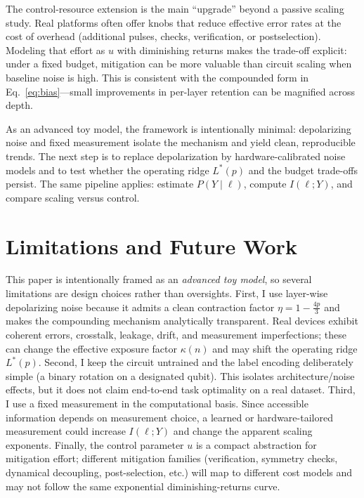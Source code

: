 \documentclass[]{ieeeaccess}
\newcommand{\MI}{I(\ell;Y)}
\begin{document}
The control-resource extension is the main ``upgrade'' beyond a passive scaling study. Real platforms often offer knobs that reduce effective error rates at the cost of overhead (additional pulses, checks, verification, or postselection). Modeling that effort as $u$ with diminishing returns makes the trade-off explicit: under a fixed budget, mitigation can be more valuable than circuit scaling when baseline noise is high. This is consistent with the compounded form in Eq.~\eqref{eq:bias}---small improvements in per-layer retention can be magnified across depth.

As an advanced toy model, the framework is intentionally minimal: depolarizing noise and fixed measurement isolate the mechanism and yield clean, reproducible trends. The next step is to replace depolarization by hardware-calibrated noise models and to test whether the operating ridge $L^{\ast}(p)$ and the budget trade-offs persist. The same pipeline applies: estimate $P(Y\mid \ell)$, compute $\MI$, and compare scaling versus control.

\section{Limitations and Future Work}
This paper is intentionally framed as an \emph{advanced toy model}, so several limitations are design choices rather than oversights. First, I use layer-wise depolarizing noise because it admits a clean contraction factor $\eta=1-\tfrac{4p}{3}$ and makes the compounding mechanism analytically transparent. Real devices exhibit coherent errors, crosstalk, leakage, drift, and measurement imperfections; these can change the effective exposure factor $\kappa(n)$ and may shift the operating ridge $L^{\ast}(p)$. Second, I keep the circuit untrained and the label encoding deliberately simple (a binary rotation on a designated qubit). This isolates architecture/noise effects, but it does not claim end-to-end task optimality on a real dataset. Third, I use a fixed measurement in the computational basis. Since accessible information depends on measurement choice, a learned or hardware-tailored measurement could increase $\MI$ and change the apparent scaling exponents. Finally, the control parameter $u$ is a compact abstraction for mitigation effort; different mitigation families (verification, symmetry checks, dynamical decoupling, post-selection, etc.) will map to different cost models and may not follow the same exponential diminishing-returns curve.
\end{document}
